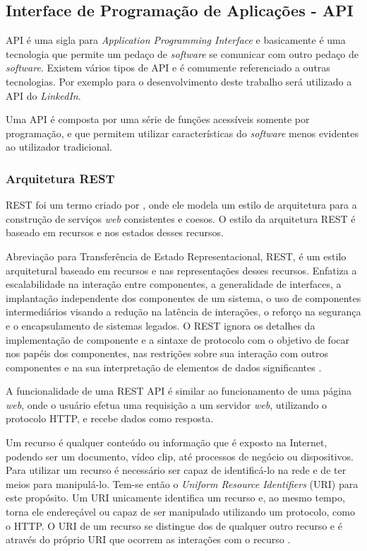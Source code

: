 \subsection{Interface de Programação de Aplicações - API}\label{subsec: api}
API é uma sigla para \textit{Application Programming Interface} e basicamente é uma tecnologia que permite um pedaço de \textit{software} se comunicar com outro pedaço de \textit{software}. Existem vários tipos de API e é comumente referenciado a outras tecnologias. Por exemplo para o desenvolvimento deste trabalho será utilizado a API do \textit{LinkedIn}. 

Uma API é composta por uma série de funções acessíveis somente por programação, e que permitem utilizar características do \textit{software} menos evidentes ao utilizador tradicional.


\subsubsection{\textbf{Arquitetura REST}}
REST foi um termo criado por , onde ele modela um estilo de arquitetura para a construção de serviços \textit{web} consistentes e coesos. O estilo da arquitetura REST é baseado em recursos e nos estados desses recursos.

Abreviação para Transferência de Estado Representacional, REST, é um estilo arquitetural baseado em recursos e nas representações desses recursos. Enfatiza a escalabilidade na interação entre componentes, a generalidade de interfaces, a implantação independente dos componentes de um sistema, o uso de componentes intermediários visando a redução na latência de interações, o reforço na segurança e o encapsulamento de sistemas legados. O REST ignora os detalhes da implementação de componente e a sintaxe de protocolo com o objetivo de focar nos papéis dos componentes, nas restrições sobre sua interação com outros componentes e na sua interpretação de elementos de dados significantes \cite{rest}.

A funcionalidade de uma REST API é similar ao funcionamento de uma página \textit{web}, onde o usuário efetua uma requisição a um servidor \textit{web}, utilizando o protocolo HTTP, e recebe dados como resposta.

Um recurso é qualquer conteúdo ou informação que é exposto na Internet, podendo ser um documento, vídeo clip, até processos de negócio ou dispositivos. Para utilizar um recurso é necessário ser capaz de identificá-lo na rede e de ter meios para manipulá-lo. Tem-se então o \textit{Uniform Resource Identifiers} (URI) para este propósito. Um URI unicamente identifica um recurso e, ao mesmo tempo, torna ele endereçável ou capaz de ser manipulado utilizando um protocolo, como o HTTP. O URI de um recurso se distingue dos de qualquer outro recurso e é através do próprio URI que ocorrem as interações com o recurso \cite{rest-book}.

